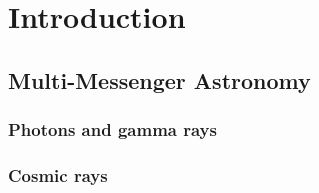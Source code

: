 \chapter{Introduction}
\label{sec:intro}



\section{Multi-Messenger Astronomy}
\label{sec:intro:multimessenger}



\subsection{Photons and gamma rays}
\label{sec:intro:gammarays}


\subsection{Cosmic rays}
\label{sec:intro:cosmicrays}

